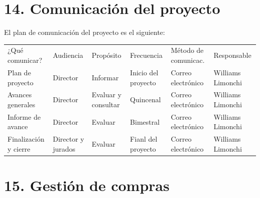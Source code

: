 \documentclass[11pt]{charter}
\begin{document}
\section{14. Comunicación del proyecto}
\label{sec:comunicaciones}
\vspace{-5px}
El plan de comunicación del proyecto es el siguiente:
\begin{table}[htpb]
\centering
\begin{tabularx}{\linewidth}{@{}|X|C{2cm}|C{2cm}|C{2.2cm}|C{2cm}|C{2.1cm}|@{}}
\hline
{} 
           \\ \hline
{} 
¿Qué comunicar? & Audiencia      & Propósito & Frecuencia & Método de comunicac. & Responsable \\ \hline
Plan de proyecto      & Director & Informar & Inicio del proyecto & Correo electrónico & Williams Limonchi \\ \hline
Avances generales     & Director & Evaluar y consultar & Quincenal & Correo electrónico & Williams Limonchi \\ \hline
Informe de avance     & Director & Evaluar             & Bimestral & Correo electrónico & Williams Limonchi \\ \hline
Finalización y cierre & Director y jurados & Evaluar   & Fianl del proyecto & Correo electrónico & Williams Limonchi \\ \hline
\end{tabularx}
\end{table}

\section{15. Gestión de compras}
\label{sec:compras}
\end{document}

